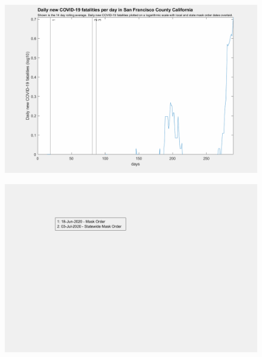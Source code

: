 \documentclass[]{article}
\begin{document}
\begin{figure}[!h]
	\includegraphics[width=\linewidth]{images/san_francisco_mask_order_fatalities_log.png}
	\caption{}
	\label{fig:images/san_francisco_mask_order_fatalities_logLabel}
\end{figure}

\begin{figure}[!h]
	\includegraphics[width=\linewidth]{legends/travis_mask_order_legend.png}
	\caption{}
	\label{fig:legends/travis_mask_order_legendLabel}
\end{figure}
\end{document}
